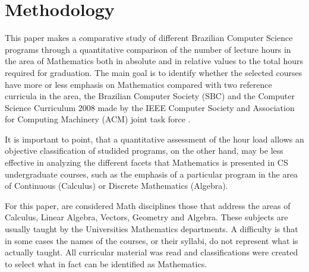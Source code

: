 \documentclass[conference]{IEEEtran}
\begin{document}
\section{Methodology}
	This paper makes a comparative study of different Brazilian Computer Science programs through a quantitative comparison of the number of lecture hours in the area of Mathematics both in absolute and in relative values to the total hours required for graduation. The main goal is to identify whether the selected courses have more or less emphasis on Mathematics compared with two reference curricula in the area, the Brazilian Computer Society (SBC) \cite{sbc} and the Computer Science Curriculum 2008 made by the IEEE Computer Society and Association for Computing Machinery (ACM) joint task force \cite{cs2008}.

	It is important to point, that a quantitative assessment of the hour load allows an objective classification of studided programs, on the other hand, may be less effective in analyzing the different facets that Mathematics is presented in CS undergraduate courses, such as the emphasis of a particular program in the area of Continuous (Calculus) or Discrete Mathematics (Algebra).



	For this paper, are considered Math disciplines those that address the areas of Calculus, Linear Algebra, Vectors, Geometry and Algebra. These subjects are usually taught by the Universities Mathematics departments. A difficulty is that in some cases the names of the courses, or their syllabi, do not represent what is actually taught. All curricular material was read and classifications were created to select what in fact can be identified as Mathematics.
\end{document}
